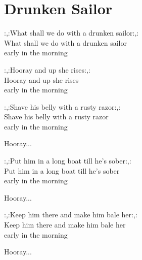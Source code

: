 \section{Drunken Sailor}

:,:What shall we do with a drunken sailor:,:\\
What shall we do with a drunken sailor\\
early in the morning

:,:Hooray and up she rises:,:\\
Hooray and up she rises\\
early in the morning

:,:Shave his belly with a rusty razor:,:\\
Shave his belly with a rusty razor\\
early in the morning

Hooray...

:,:Put him in a long boat till he's sober:,:\\
Put him in a long boat till he's sober\\
early in the morning

Hooray...

:,:Keep him there and make him bale her:,:\\
Keep him there and make him bale her\\
early in the morning

Hooray...